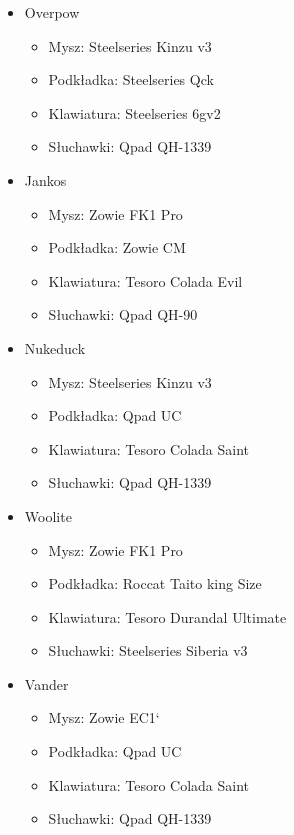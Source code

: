 \documentclass{article}
\begin{document}
\begin{itemize}
  \item Overpow
  \begin{itemize}
    \item Mysz: Steelseries Kinzu v3
    \item Podkładka: Steelseries Qck
    \item Klawiatura: Steelseries 6gv2
    \item Słuchawki: Qpad QH-1339
  \end{itemize}
  \item Jankos
  \begin{itemize}
    \item Mysz: Zowie FK1 Pro
    \item Podkładka: Zowie CM
    \item Klawiatura: Tesoro Colada Evil
    \item Słuchawki: Qpad QH-90
  \end{itemize}
  \item Nukeduck
  \begin{itemize}
    \item Mysz: Steelseries Kinzu v3
    \item Podkładka: Qpad UC
    \item Klawiatura: Tesoro Colada Saint
    \item Słuchawki: Qpad QH-1339
  \end{itemize}
  \item Woolite
  \begin{itemize}
    \item Mysz: Zowie FK1 Pro
    \item Podkładka: Roccat Taito king Size
    \item Klawiatura: Tesoro Durandal Ultimate
    \item Słuchawki: Steelseries Siberia v3
  \end{itemize}
  \item Vander
  \begin{itemize}
    \item Mysz: Zowie EC1`
    \item Podkładka: Qpad UC
    \item Klawiatura: Tesoro Colada Saint
    \item Słuchawki: Qpad QH-1339
  \end{itemize}
\end{itemize}
\end{document}
